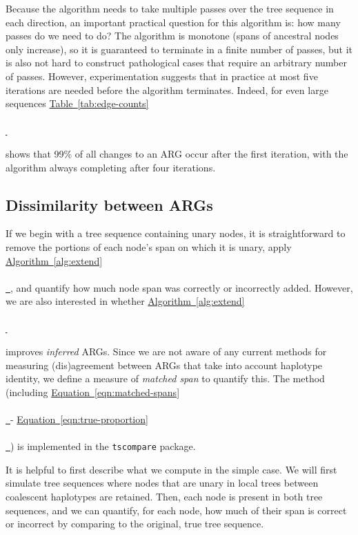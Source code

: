 \documentclass[10pt,twoside,lineno]{gsajnl}
\newcommand{\tscompare}{\texttt{tscompare}}
\newcommand{\algorithmref}[2][]{%
	\hyperref[{#2}]{%
		Algorithm~\ref*{#2}%
		\ifx\\#1\\%
		\else
		\,#1%
		\fi
	}%
}
\newcommand*{\tabref}[2][]{%
	\hyperref[{#2}]{%
		Table~\ref*{#2}%
		\ifx\\#1\\%
		\else
		\,#1%
		\fi
	}%
}
\newcommand*{\eqnref}[2][]{%
	\hyperref[{#2}]{%
		Equation~\ref*{#2}%
		\ifx\\#1\\%
		\else
		\,#1%
		\fi
	}%
}
\begin{document}
Because the algorithm needs to take multiple passes over the tree sequence
in each direction,
an important practical question for this algorithm is:
how many passes do we need to do?
The algorithm is monotone (spans of ancestral nodes only increase),
so it is guaranteed to terminate in a finite number of passes,
but it is also not hard to construct pathological cases that require an arbitrary number of passes.
However, experimentation suggests that 
in practice at most five iterations are needed before the algorithm terminates.
Indeed, for even large sequences \tabref{tab:edge-counts}
shows that 99\% of all changes to an ARG occur after the first iteration,
with the algorithm always completing after four iterations. 


\subsection{Dissimilarity between ARGs}

If we begin with a tree sequence containing unary nodes,
it is straightforward to remove the portions of each node's span on which it is unary,
apply \algorithmref{alg:extend},
and quantify how much node span was correctly or incorrectly added.
However, we are also interested in whether \algorithmref{alg:extend}
improves \emph{inferred} ARGs.
Since we are not aware of any current methods for measuring (dis)agreement between ARGs
that take into account haplotype identity,
we define a measure of \emph{matched span} to quantify this.
The method (including \eqnref{eqn:matched-spans} - \eqnref{eqn:true-proportion}) 
 is implemented in the \tscompare{} package.

It is helpful to first describe what we compute in the simple case.
We will first simulate tree sequences where
nodes that are unary in local trees between coalescent haplotypes are retained.
Then, each node is present in both tree sequences,
and we can quantify, for each node, how much of their span is correct or incorrect
by comparing to the original, true tree sequence.
\end{document}

